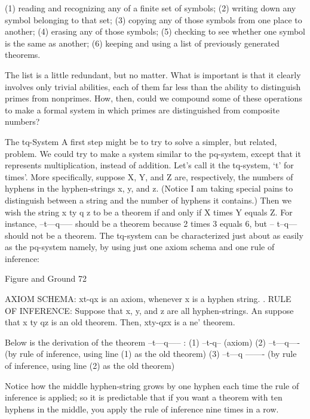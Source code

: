       (1) reading and recognizing any of a finite set of symbols;
      (2) writing down any symbol belonging to that set;
      (3) copying any of those symbols from one place to another;
      (4) erasing any of those symbols;
      (5) checking to see whether one symbol is the same as another;
      (6) keeping and using a list of previously generated theorems.

The list is a little redundant, but no matter. What is important is that it clearly involves
only trivial abilities, each of them far less than the ability to distinguish primes from
nonprimes. How, then, could we compound some of these operations to make a formal
system in which primes are distinguished from composite numbers?

                                     The tq-System
A first step might be to try to solve a simpler, but related, problem. We could try to make
a system similar to the pq-system, except that it represents multiplication, instead of
addition. Let's call it the tq-system, `t' for times'. More specifically, suppose X, Y, and Z
are, respectively, the numbers of hyphens in the hyphen-strings x, y, and z. (Notice I am
taking special pains to distinguish between a string and the number of hyphens it
contains.) Then we wish the string x ty q z to be a theorem if and only if X times Y
equals Z. For instance, --t---q----- should be a theorem because 2 times 3 equals 6, but --
t--q--- should not be a theorem. The tq-system can be characterized just about as easily as
the pq-system namely, by using just one axiom schema and one rule of inference:




Figure and Ground                                                                         72

AXIOM SCHEMA: xt-qx is an axiom, whenever x is a hyphen string.
.
RULE OF INFERENCE: Suppose that x, y, and z are all hyphen-strings. An suppose that
     x ty qz is an old theorem. Then, xty-qzx is a ne' theorem.

Below is the derivation of the theorem --t---q-----
:
     (1)       --t-q--         (axiom)
     (2)       --t—q----       (by rule of inference, using line (1) as the old theorem)
     (3)       --t---q ------- (by rule of inference, using line (2) as the old theorem)

Notice how the middle hyphen-string grows by one hyphen each time the rule of
inference is applied; so it is predictable that if you want a theorem with ten hyphens in
the middle, you apply the rule of inference nine times in a row.

